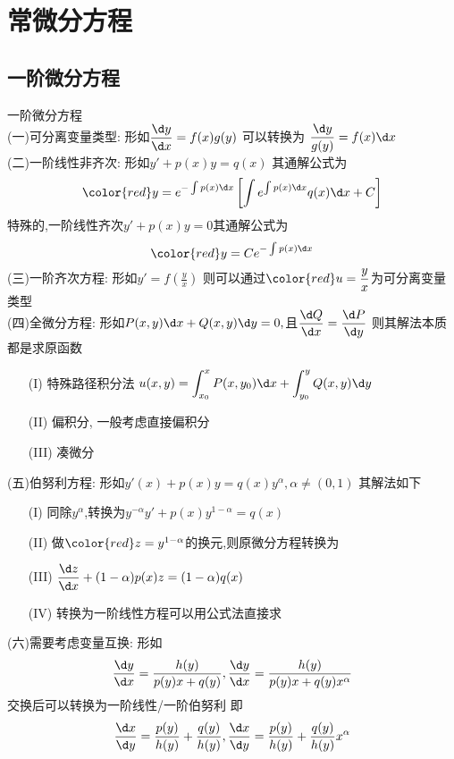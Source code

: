 \documentclass[12pt, a4paper, oneside, UTF8]{ctexbook}
\begin{document}
\else
\fi

\chapter{常微分方程}
\section{一阶微分方程}
\begin{remark}
    一阶微分方程 \\
    (一)可分离变量类型: 形如$\displaystyle\frac{\d y}{\d x}=f(x)g(y)$ 可以转换为 $\displaystyle \frac{\d y}{g(y)}=f(x)\d x$ \\
    (二)一阶线性非齐次: 形如$y'+p(x)y=q(x)$ 其通解公式为
    $$
    \color{red}
    y=e^{-\int p(x)\d x}\left[\int e^{\int p(x)\d x}q(x)\d x + C\right]
    $$
    特殊的,一阶线性齐次$y'+p(x)y=0$其通解公式为
    $$
    \color{red}
    y=Ce^{-\int p(x)\d x}
    $$
    (三)一阶齐次方程: 形如$\displaystyle y' = f(\frac{y}{x})$ 则可以通过${\displaystyle\color{red}u=\frac{y}{x}}$为可分离变量类型 \\
    (四)全微分方程: 形如$P(x,y)\d x + Q(x,y)\d y = 0,$且$\displaystyle \frac{\d Q}{\d x}=\frac{\d P}{\d y}$ 则其解法本质都是求原函数 
    \begin{enumerate}
        \item [(I)] 特殊路径积分法 $\displaystyle u(x,y)=\int_{x_0}^{x}P(x,y_0)\d x + \int_{y_0}^{y}Q(x,y)\d y$ 
        \item [(II)] {\color{red} 偏积分, 一般考虑直接偏积分}
        \item [(III)] 凑微分
    \end{enumerate}
    (五)伯努利方程: 形如$y'(x)+p(x)y=q(x)y^{\alpha},\alpha\neq (0, 1)$ 其解法如下 
    \begin{enumerate}
        \item [(I)] 同除$y^{\alpha}$,转换为$y^{-\alpha}y'+p(x)y^{1-\alpha}=q(x)$
        \item [(II)] 做$\color{red}z=y^{1-\alpha}$的换元,则原微分方程转换为 
        \item [(III)] $\displaystyle \frac{\d z}{\d x} + (1-\alpha)p(x)z=(1-\alpha)q(x)$ 
        \item [(IV)] 转换为一阶线性方程可以用公式法直接求
    \end{enumerate}
    (六)需要考虑变量互换: 形如
    $$
    \frac{\d y}{\d x} = \frac{h(y)}{p(y)x + q(y)}, \frac{\d y}{\d x}=\frac{h(y)}{p(y)x+q(y)x^{\alpha}}
    $$
    交换后可以转换为一阶线性/一阶伯努利 即
    $$
    \frac{\d x}{\d y} = \frac{p(y)}{h(y)} + \frac{q(y)}{h(y)}, \frac{\d x}{\d y} = \frac{p(y)}{h(y)} + \frac{q(y)}{h(y)}x^{\alpha}
    $$
\end{remark}
\end{document}
